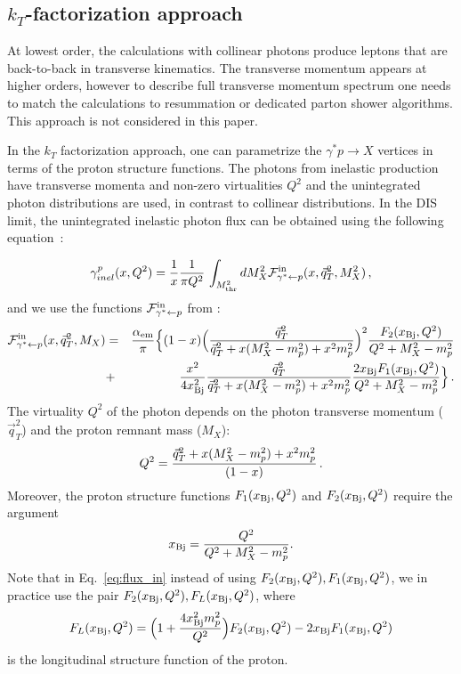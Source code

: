 \subsection{$k_T$-factorization approach}


At lowest order, the calculations with collinear photons  produce leptons that are back-to-back in transverse kinematics.
The transverse momentum appears at higher orders, however to describe full transverse momentum spectrum  one needs  
to match the calculations to resummation or dedicated parton shower algorithms. This approach is not considered in this paper.

In the $k_T$ factorization approach, one can parametrize the $\gamma^*p \rightarrow X$ vertices in terms of the proton structure functions. The photons from inelastic production have transverse momenta and non-zero virtualities $Q^2$ and the unintegrated photon distributions are used, in contrast to collinear distributions.
In the DIS limit, the unintegrated inelastic photon flux can be obtained using the following equation~\cite{daSilveira:2014jla, Luszczak:2015aoa}:

\begin{eqnarray}
\gamma^p_{inel}(x,Q^2) = {1\over x} 
{1 \over \pi Q^2} \, \int_{M^2_{\rm thr}} dM_X^2 {\cal{F}}^{\mathrm{in}}_{\gamma^* \leftarrow p} (x,\vec{q}_T^2,M^2_X) \, ,
\end{eqnarray}
and we use the functions $ {\cal{F}}^{\mathrm{in}}_{\gamma^* \leftarrow p}$ from \cite{Budnev:1974de, Luszczak:2018ntp}:
\begin{eqnarray}
{\cal{F}}^{\mathrm{in}}_{\gamma^* \leftarrow p} (x,\vec{q}_T^2, M_X) &=& {\alpha_{\rm em} \over \pi} 
\Big\{(1-x) \Big( {\vec{q}_T^2 \over \vec{q}_T^2 + x (M_X^2 - m_p^2) + x^2 m_p^2  }\Big)^2  
{F_2(x_{\rm Bj},Q^2) \over Q^2 + M_X^2 - m_p^2}  \nonumber \\
&+& {x^2 \over 4 x^2_{\rm Bj}}  
{\vec{q}_T^2 \over \vec{q}_T^2 + x (M_X^2 - m_p^2) + x^2 m_p^2  }
{2 x_{\rm Bj} F_1(x_{\rm Bj},Q^2) \over Q^2 + M_X^2 - m_p^2} \Big\} \, .
\label{eq:flux_in}
\end{eqnarray}
The virtuality $Q^2$ of the photon depends on the photon transverse momentum ($\vec{q}_T^2$) and the proton remnant mass ($M_X$):
\begin{eqnarray}
Q^2 =  {\vec{q}_T^2 + x (M_X^2 - m_p^2) + x^2 m_p^2 \over (1-x)} \, .
\label{eq:q2}
\end{eqnarray}
Moreover, the proton structure functions $F_1(x_{\rm Bj},Q^2)$ and $F_2(x_{\rm Bj},Q^2)$ require the argument
\begin{eqnarray}
x_{\rm Bj} = {Q^2 \over Q^2+M^2_X -m_p^2}.
\end{eqnarray}
Note that in Eq.~\ref{eq:flux_in} instead of using $F_2(x_{\rm Bj},Q^2),F_1(x_{\rm Bj},Q^2)$, 
we in practice use the pair $F_2(x_{\rm Bj},Q^2),F_L(x_{\rm Bj},Q^2)$, where
\begin{eqnarray}
F_L(x_{\rm Bj},Q^2) = \Big( 1 + {4 x_{\rm Bj}^2 m_p^2 \over Q^2} \Big) F_2(x_{\rm Bj},Q^2) - 2 x_{\rm Bj} F_1(x_{\rm Bj},Q^2)
\end{eqnarray}
is the longitudinal structure function of the proton.


